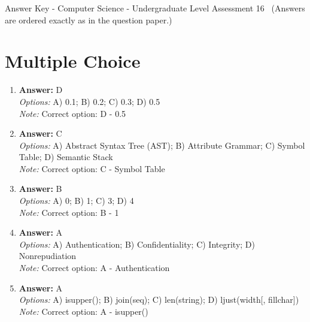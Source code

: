 \documentclass[12pt]{article}
\begin{document}
\begin{center}
Answer Key - Computer Science - Undergraduate Level Assessment 16 \
\small (Answers are ordered exactly as in the question paper.)
\end{center}

\section*{Multiple Choice}
\begin{enumerate}[label=\arabic*.]
\item \textbf{Answer:} D
\\ \textit{Options:} A) 0.1; B) 0.2; C) 0.3; D) 0.5
\\ \textit{Note:} Correct option: D - 0.5
\item \textbf{Answer:} C
\\ \textit{Options:} A) Abstract Syntax Tree (AST); B) Attribute Grammar; C) Symbol Table; D) Semantic Stack
\\ \textit{Note:} Correct option: C - Symbol Table
\item \textbf{Answer:} B
\\ \textit{Options:} A) 0; B) 1; C) 3; D) 4
\\ \textit{Note:} Correct option: B - 1
\item \textbf{Answer:} A
\\ \textit{Options:} A) Authentication; B) Confidentiality; C) Integrity; D) Nonrepudiation
\\ \textit{Note:} Correct option: A - Authentication
\item \textbf{Answer:} A
\\ \textit{Options:} A) isupper(); B) join(seq); C) len(string); D) ljust(width[, fillchar])
\\ \textit{Note:} Correct option: A - isupper()
\end{enumerate}
\end{document}
